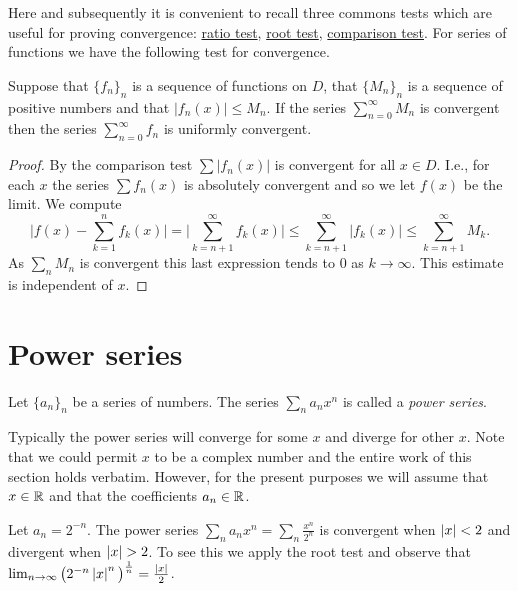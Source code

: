 Here and subsequently it is convenient to recall three commons tests which are useful for proving convergence:
\href{https://en.wikipedia.org/wiki/Ratio_test}{ratio test},
\href{https://en.wikipedia.org/wiki/Root_test}{root test},
\href{https://en.wikipedia.org/wiki/Direct_comparison_test}{comparison test}.
%
For series of functions we have the following test for convergence.

\begin{theorem}
  Suppose that \({\{f_n\}}_n\) is a sequence of functions on \(D\), that \({\{M_n\}}_n\) is a sequence of positive numbers
  and that \(|f_n(x)|\leq M_n\).
  If the series \(\sum_{n=0}^{\infty}M_n\) is convergent then the series \(\sum_{n=0}^{\infty}f_n\) is uniformly convergent.
\end{theorem}



\begin{proof}
  By the comparison test \(\sum |f_n(x)| \) is convergent for all \(x\in D\).
  I.e., for each \(x\) the series \(\sum f_n(x) \) is absolutely convergent and so we let \(f(x)\) be the limit.
  We compute
  \[
    \Big|f(x) - \sum_{k=1}^{n} f_k(x)  \Big|
    =
    \Big|\sum_{k=n+1}^{\infty} f_k(x)  \Big|
    \leq \sum_{k=n+1}^{\infty} |f_k(x)|
    \leq  \sum_{k=n+1}^{\infty} M_k.
  \]
  As \(\sum_{n}M_n\) is convergent this last expression tends to \(0\) as \(k\to \infty\).
  This estimate is independent of \(x\).
\end{proof}




\section{Power series}



\begin{definition}
  Let \({\{a_n\}}_{n}\) be a series of numbers.
  The series
  \(\sum_{n} a_n x^n\)
  is called a \emph{power series}.
\end{definition}
Typically the power series will converge for some \(x\) and diverge for other \(x\).
Note that we could permit \(x\) to be a complex number and the entire work of this section holds verbatim.
However, for the present purposes we will assume that \(x \in \mathbb{R}\) and that the coefficients \(a_n \in \mathbb{R}\).

\begin{example*}
  Let \(a_n = 2^{-n}\).
  The power series \(\sum_{n} a_n x^n = \sum_{n}\frac{x^n}{2^n}\) is convergent when \(\left|x\right|<2\) and divergent  when \(\left|x\right| > 2\).
  To see this we apply the root test and observe that  \(\lim_{n\to\infty}{\big(2^{-n}\left|x\right|^n \big)}^{\frac{1}{n}}=\frac{\left|x\right|}{2}\).
\end{example*}

